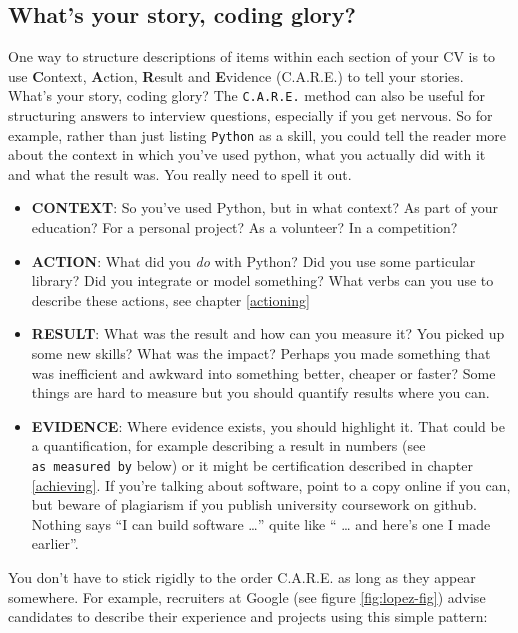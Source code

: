 \documentclass[
]{book}
\providecommand{\tightlist}{%
  \setlength{\itemsep}{0pt}\setlength{\parskip}{0pt}}
\begin{document}
\hypertarget{care}{%
\subsection{What's your story, coding glory?}\label{care}}

One way to structure descriptions of items within each section of your CV is to use \textbf{C}ontext, \textbf{A}ction, \textbf{R}esult and \textbf{E}vidence (C.A.R.E.) to tell your stories. What's your story, coding glory? \citep{whatsthestory} The \texttt{C.A.R.E.} method can also be useful for structuring answers to interview questions, especially if you get nervous. So for example, rather than just listing \texttt{Python} as a skill, you could tell the reader more about the context in which you've used python, what you actually did with it and what the result was. You really need to spell it out.

\begin{itemize}
\tightlist
\item
  \textbf{CONTEXT}: So you've used Python, but in what context? As part of your education? For a personal project? As a volunteer? In a competition?
\item
  \textbf{ACTION}: What did you \emph{do} with Python? Did you use some particular library? Did you integrate or model something? What verbs can you use to describe these actions, see chapter \ref{actioning}
\item
  \textbf{RESULT}: What was the result and how can you measure it? You picked up some new skills? What was the impact? Perhaps you made something that was inefficient and awkward into something better, cheaper or faster? Some things are hard to measure but you should quantify results where you can.
\item
  \textbf{EVIDENCE}: Where evidence exists, you should highlight it. That could be a quantification, for example describing a result in numbers (see \texttt{as\ measured\ by} below) or it might be certification described in chapter \ref{achieving}. If you're talking about software, point to a copy online if you can, but beware of plagiarism if you publish university coursework on github. Nothing says ``I can build software \ldots{}'' quite like `` \ldots{} and here's one I made earlier''.
\end{itemize}

You don't have to stick rigidly to the order C.A.R.E. as long as they appear somewhere. For example, recruiters at Google (see figure \ref{fig:lopez-fig}) advise candidates to describe their experience and projects using this simple pattern:
\end{document}
